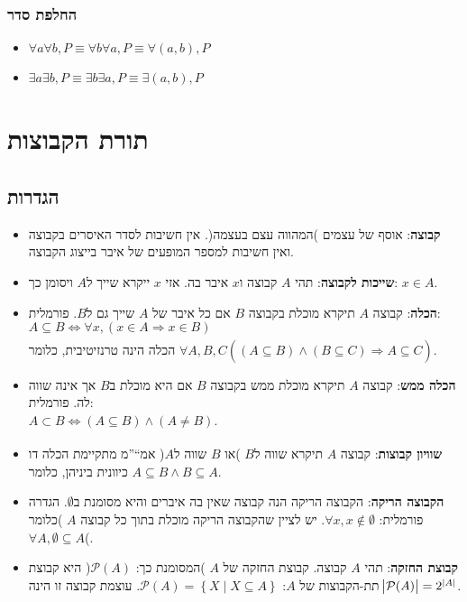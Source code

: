 \documentclass[11pt, oneside]{article}
\newcommand{\opr}[1]{\underset{\text{#1}}{\Rightarrow}}
\newcommand{\bidiarrow}[1]{\underset{\text{#1}}{\Leftrightarrow}}
\newcommand{\definition}[2]{\textbf{#1}: #2.}
\begin{document}
\subsubsection*{החלפת סדר}
\begin{itemize}
\item $\forall a \forall b, P \equiv \forall b \forall a, P \equiv \forall (a, b), P$
\item $\exists a \exists b, P \equiv \exists b \exists a, P \equiv \exists (a, b), P$
\end{itemize}
\clearpage

\section*{תורת הקבוצות}
\subsection*{הגדרות}
\begin{itemize}
\item \definition{קבוצה}{אוסף של עצמים )המהווה עצם בעצמה(. אין חשיבות לסדר האיסרים בקבוצה ואין חשיבות למספר המופעים של איבר בייצוג הקבוצה}
\item \definition{שייכות לקבוצה}{תהי $A$ קבוצה ו$x$ איבר בה. אזי $x$ ייקרא שייך ל$A$ ויסומן כך: $x \in A$}
\item \definition{הכלה}{קבוצה $A$ תיקרא מוכלת בקבוצה $B$ אם כל איבר של $A$ שייך גם ל$B$. פורמלית:\\
$A \subseteq B \bidiarrow{} \forall x, (x \in A \Rightarrow x \in B)$\\
הכלה הינה טרנזיטיבית, כלומר $\forall A, B, C ((A \subseteq B) \land (B \subseteq C) \opr{} A \subseteq C)$}
\item \definition{הכלה ממש}{קבוצה $A$ תיקרא מוכלת ממש בקבוצה $B$ אם היא מוכלת ב$B$ אך אינה שווה לה. פורמלית:\\
$A \subset B \bidiarrow{} (A \subseteq B) \land (A \neq B)$}
\item \definition{שוויון קבוצות}{קבוצה $A$ תיקרא שווה ל$B$ )או $B$ שווה ל$A$( אמ``''מ מתקיימת הכלה דו כיוונית ביניהן, כלומר $A \subseteq B \land B \subseteq A$}
\item \definition{הקבוצה הריקה}{הקבוצה הריקה הנה קבוצה שאין בה איברים והיא מסומנת ב$\emptyset$. הגדרה פורמלית:
$\forall x, x \not\in \emptyset$. יש לציין שהקבוצה הריקה מוכלת בתוך כל קבוצה $A$ )כלומר $\forall A, \emptyset \subseteq A$(}
\item \definition{קבוצת החזקה}{
תהי $A$ קבוצה. קבוצת החזקה של $A$ )המסומנת כך: $\mathcal{P}(A)$( היא קבוצת תת-הקבוצות של $A$: $\mathcal{P}(A) = \left\{X \mid X \subseteq A\right\}$. עוצמת קבוצה זו הינה $\abs{\mathcal{P}(A)} = 2^{|A|}$}
\end{itemize}
\end{document}

